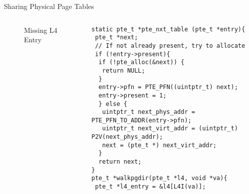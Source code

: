 \documentclass[aspectratio=169,xcolor=dvipsnames]{beamer}
\begin{document}
\begin{frame}[fragile]{Sharing Physical Page Tables}
\begin{columns}[c]
\begin{figure}
\begin{tikzpicture}[x=0.75pt,y=0.75pt,yscale=-0.5,xscale=0.5]
\end{tikzpicture}
        \caption{Missing L4 Entry}
        \label{fig:enter-label}
    \end{figure}
\begin{lstlisting}[style=CStyleNum, basicstyle=\tiny]
static pte_t *pte_nxt_table (pte_t *entry){
 pte_t *next;
 // If not already present, try to allocate
 if (!entry->present){
  if (!pte_alloc(&next)) {
   return NULL;
  }
  entry->pfn = PTE_PFN((uintptr_t) next);
  entry->present = 1;
  } else {
   uintptr_t next_phys_addr = PTE_PFN_TO_ADDR(entry->pfn);        
   uintptr_t next_virt_addr = (uintptr_t) P2V(next_phys_addr);
   next = (pte_t *) next_virt_addr;
  }
  return next;
}   
pte_t *walkpgdir(pte_t *l4, void *va){ 
 pte_t *l4_entry = &l4[L4I(va)];
\end{lstlisting}
\end{columns}
\end{frame}
\end{document}
